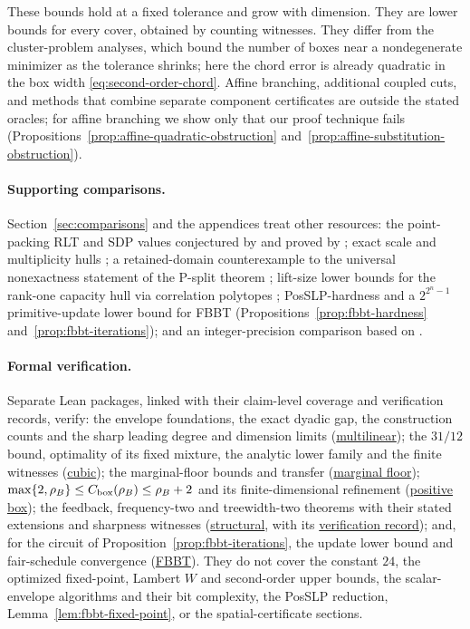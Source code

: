 \documentclass[11pt]{article}
\begin{document}
These bounds hold at a fixed tolerance and grow with dimension. They are
lower bounds for every cover, obtained by counting witnesses. They differ
from the cluster-problem analyses, which bound the number of boxes near a
nondegenerate minimizer as the tolerance shrinks; here the chord error is
already quadratic in the box width \eqref{eq:second-order-chord}. Affine branching, additional
coupled cuts, and methods that combine separate component certificates
are outside the stated oracles; for affine branching we show only that our
proof technique fails (Propositions~\ref{prop:affine-quadratic-obstruction}
and~\ref{prop:affine-substitution-obstruction}).

\paragraph{Supporting comparisons.}
Section~\ref{sec:comparisons} and the appendices treat other resources:
the point-packing RLT and SDP values conjectured by \citet{Anstreicher2009}
and proved by \citet{Khajavirad2024}; exact scale and multiplicity hulls
\citep{Balas1998}; a retained-domain counterexample to the universal
nonexactness statement of the P-split theorem \citep{KronqvistEtAl2026};
lift-size lower bounds for the rank-one capacity hull via correlation
polytopes \citep{BraunEtAl2015,LRS2015}; PosSLP-hardness and a
$2^{2^n-1}$ primitive-update lower bound for FBBT
(Propositions~\ref{prop:fbbt-hardness} and~\ref{prop:fbbt-iterations});
and an integer-precision comparison based on \citet{LubinEtAl2022}.

\paragraph{Formal verification.}
Separate Lean packages, linked with their claim-level coverage and
verification records, verify: the envelope foundations, the exact dyadic
gap, the construction counts and the sharp leading degree and dimension
limits
(\href{../formal/topics/10-multilinear-completion/COVERAGE.md}{multilinear});
the $31/12$ bound, optimality of its fixed mixture, the analytic lower
family and the finite witnesses
(\href{../formal/topics/11-cubic-completion/COVERAGE.md}{cubic}); the
marginal-floor bounds and transfer
(\href{../formal/topics/12-marginal-floor/COVERAGE.md}{marginal floor});
$\max\{2,\rho_B\}\le C_{\rm box}(\rho_B)\le\rho_B+2$ and its
finite-dimensional refinement
(\href{../formal/topics/18-positive-box/COVERAGE.md}{positive box}); the
feedback, frequency-two and treewidth-two theorems with their stated
extensions and sharpness witnesses
(\href{../formal/topics/19-structural-multilinear/COVERAGE.md}{structural},
with its
\href{../formal/topics/19-structural-multilinear/VERIFICATION.md}{verification record});
and, for the circuit of Proposition~\ref{prop:fbbt-iterations}, the update
lower bound and fair-schedule convergence
(\href{../formal/topics/02-fbbt/COVERAGE.md}{FBBT}). They do not cover the
constant $24$, the optimized fixed-point, Lambert $W$ and second-order
upper bounds, the scalar-envelope algorithms and their bit complexity, the
PosSLP reduction, Lemma~\ref{lem:fbbt-fixed-point}, or the
spatial-certificate sections.
\end{document}

